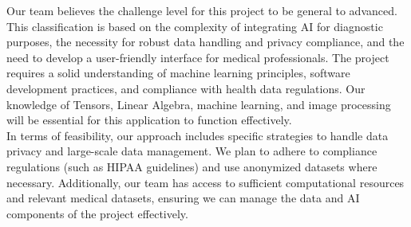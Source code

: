 \documentclass[12pt, titlepage]{article}
\begin{document}
Our team believes the challenge level for this project to be general to advanced. This classification is based on the complexity of integrating AI for diagnostic purposes, the necessity for robust data handling and privacy compliance, and the need to develop a user-friendly interface for medical professionals. The project requires a solid understanding of machine learning principles, software development practices, and compliance with health data regulations. Our knowledge of Tensors, Linear Algebra, machine learning, and image processing will be essential for this application to function effectively. \\
In terms of feasibility, our approach includes specific strategies to handle data privacy and large-scale data management. We plan to adhere to compliance regulations (such as HIPAA guidelines) and use anonymized datasets where necessary. Additionally, our team has access to sufficient computational resources and relevant medical datasets, ensuring we can manage the data and AI components of the project effectively. \\
\end{document}
